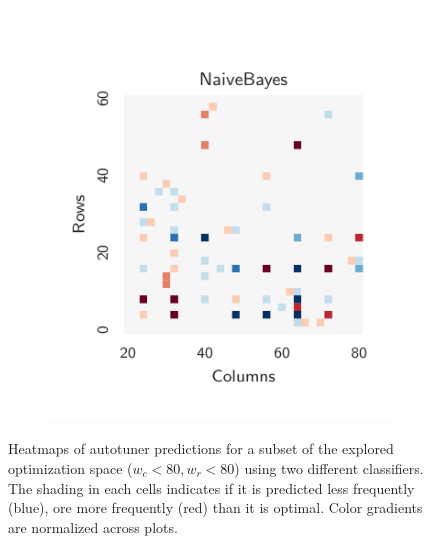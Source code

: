 \documentclass[nonatbib,preprint,nocopyrightspace,9pt]{sigplanconf}
\begin{document}
\begin{figure}
\begin{subfigure}[t]{0.48\columnwidth}
\includegraphics[width=\columnwidth]{img/heatmap_2}
\vspace{-1.5em} %
\caption{}
\label{fig:class-hmaps-2}
\end{subfigure}
\vspace{-.5em}
\caption{%
  Heatmaps of autotuner predictions for a subset of the explored
  optimization space ($w_c < 80, w_r < 80$) using two different
  classifiers. The shading in each cells indicates if it is predicted
  less frequently (blue), ore more frequently (red) than it is
  optimal. Color gradients are normalized across plots.
  \vspace{-1.5em}%
}
\label{fig:class-hmaps}
\end{figure}
\end{document}
